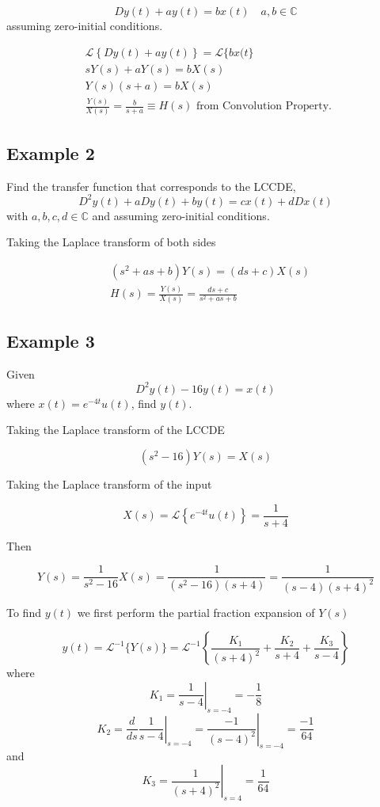 \documentclass{article}
\begin{document}
$$
D y(t)+a y(t)=b x(t) \quad a, b \in \mathbb{C}
$$
assuming zero-initial conditions.

$$
\begin{aligned}
& \mathcal{L}\left\{D y(t)+a y(t)\right\}=\mathcal{L}\{b x(t\} \\
& s Y(s)+a Y(s)=b X(s) \\
& Y(s)(s+a)=b X(s) \\
& \frac{Y(s)}{X(s)}=\frac{b}{s+a} \equiv H(s) \text { from Convolution Property. }
\end{aligned}
$$

\subsection{Example 2}
Find the transfer function that corresponds to the LCCDE,
$$
D^{2} y(t)+a D y(t)+b y(t)=c x(t)+d D x(t) 
$$
with $a, b, c, d \in \mathbb{C}$ and assuming zero-initial conditions.

Taking the Laplace transform of both sides

$$
\begin{aligned}
& \left(s^{2}+a s+b\right) Y(s)=(d s+c) X(s) \\
& H(s)=\frac{Y(s)}{X(s)}=\frac{d s+c}{s^{2}+a s+b}
\end{aligned}
$$

\subsection{Example 3}

Given
$$
D^{2} y(t)-16 y(t)=x(t)
$$
where $x(t)=e^{-4 t} u(t)$, find $y(t)$.

Taking the Laplace transform of the LCCDE

$$
(s^2 - 16)Y(s) = X(s)
$$

Taking the Laplace transform of the input

$$
X(s) = \mathcal{L}\left\{ e^{-4 t} u(t) \right\} = \frac{1}{s+4}
$$

Then

$$
Y(s) = \frac{1}{s^2 - 16} X(s) = \frac{1}{(s^2 - 16)(s+4)} = \frac{1}{(s - 4)(s+4)^2} 
$$

To find $y(t)$ we first perform the partial fraction expansion of $Y(s)$

\[
y(t)=\mathcal{L}^{-1}\{Y(s)\}=\mathcal{L}^{-1}\left\{\frac{K_{1}}{(s+4)^{2}}+\frac{K_{2}}{s+4}+\frac{K_{3}}{s-4}\right\}
\]
where
\[
K_{1}=\left.\frac{1}{s-4}\right|_{s=-4}=-\frac{1}{8}
\]
\[
K_{2}=\left.\frac{d}{d s} \frac{1}{s-4}\right|_{s=-4}=\left.\frac{-1}{(s-4)^{2}}\right|_{s=-4}=\frac{-1}{64}
\]
and
\[
K_{3}=\left.\frac{1}{(s+4)^{2}}\right|_{s=4}=\frac{1}{64}
\]
\end{document}
